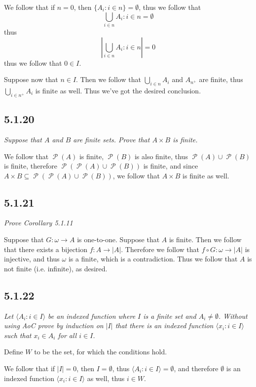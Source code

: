 \documentclass[11pt,oneside,titlepage]{book}
\DeclareMathOperator \pow {\mathcal {P}}
\newcommand{\eangle}[1]{\langle #1 \rangle}
\begin{document}
We follow that if $n = 0$, then $\{A_i: i \in n\} = \emptyset$, thus we follow that
$$\bigcup_{i \in n}{A_i: i \in n} = \emptyset$$
thus
$$|\bigcup_{i \in n}{A_i: i \in n}| = 0$$
thus we follow that $0 \in I$.

Suppose now that $n \in I$. Then we follow that $\bigcup_{i \in n}{A_i}$ and $A_{n^+}$ are finite,
thus $\bigcup_{i \in n^+}{A_i}$ is finite as well. Thus we've got the desired conclusion.

\subsection*{5.1.20}

\textit{Suppose that $A$ and $B$ are finite sets. Prove that $A \times B$ is finite.}

We follow that $\pow(A)$ is finite, $\pow(B)$ is also finite, thus $\pow(A) \cup \pow(B)$
is finite, therefore $\pow(\pow(A) \cup \pow(B))$ is finite, and since
$A \times B \subseteq \pow(\pow(A) \cup \pow(B))$, we follow that $A \times B$ is finite
as well.

\subsection*{5.1.21 }

\textit{Prove Corollary 5.1.11}

Suppose that $G: \omega \to A$ is one-to-one. Suppose that $A$ is finite. Then we follow that
there exists a bijection $f: A \to |A|$. Therefore we follow that
$f \circ G: \omega \to |A|$ is injective, and thus $\omega$ is a finite, which is a contradiction.
Thus we follow that $A$ is not finite (i.e. infinite), as desired.

\subsection*{5.1.22}

\textit{Let $\eangle{A_i: i \in I}$ be an indexed function where $I$ is a finite set and
  $A_i \neq \emptyset$. Without using AoC prove by induction on $|I|$ that there is
  an indexed function $\eangle{x_i: i \in I}$ such that $x_i \in A_i$ for all $i \in I$.}

Define $W$ to be the set, for which the conditions hold.

We follow that if $|I| = 0$, then $I = \emptyset$, thus $\eangle{A_i: i \in I} = \emptyset$,
and therefore $\emptyset$ is an indexed function $\eangle{x_i: i \in I}$ as well, thus
$i \in W$.
\end{document}
